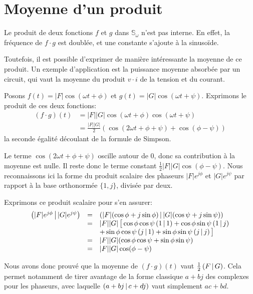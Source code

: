 \section{Moyenne d'un produit}

Le produit de deux fonctions $f$ et $g$ dans $\mathbb{S}_\omega$
n'est pas interne.
En effet, la fréquence de $f \cdot g$ est doublée,
et une constante s'ajoute à la sinusoïde.

Toutefois, il est possible d'exprimer de manière intéressante
la moyenne de ce produit.
Un exemple d'application est la puissance moyenne absorbée par un circuit,
qui vaut la moyenne du produit $v\cdot i$ de la tension et du courant.

Posons $f(t) = |F|\cos(\omega t + \phi)$ et $g(t) = |G|\cos(\omega t + \psi)$.
Exprimons le produit de ces deux fonctions:
\begin{equation}
    \begin{split}
        (f\cdot g)(t) &= |F||G|\cos(\omega t + \phi)\cos(\omega t + \psi) \\
        &= \frac{|F||G|}{2}(\cos(2\omega t + \phi + \psi) + \cos(\phi - \psi))
    \end{split}
\end{equation}
la seconde égalité découlant de la formule de Simpson.

Le terme $\cos(2\omega t + \phi + \psi)$ oscille autour de 0,
donc sa contribution à la moyenne est nulle.
Il reste donc le terme constant $\frac{1}{2}|F||G|\cos(\phi - \psi)$.
Nous reconnaissons ici la forme du produit scalaire des phaseurs
$|F|e^{j\phi}$ et $|G|e^{j\psi}$ par rapport à la base orthonormée $\{1,j\}$,
divisée par deux.

Exprimons ce produit scalaire pour s'en assurer:
\begin{equation}
    \begin{array}{rcl}
        \left(|F|e^{j\phi}\,\middle|\,|G|e^{j\psi}\right)
        &=& \left(|F|(\cos\phi+j\sin\phi)\,\middle|\,|G|(\cos\psi+j\sin\psi)\right) \\
        &=& |F||G|\,\big[\cos\phi\cos\psi \left(1\,\middle|\,1\right)
        + \cos\phi\sin\psi \left(1\,\middle|\,j\right) \\
        && + \sin\phi\cos\psi \left(j\,\middle|\,1\right)
        + \sin\phi\sin\psi \left(j\,\middle|\,j\right)\big] \\
        &=& |F||G|(\cos\phi\cos\psi + \sin\phi\sin\psi) \\
        &=& |F||G|\cos(\phi-\psi)
    \end{array}
\end{equation}

Nous avons donc prouvé que la moyenne de $(f\cdot g)(t)$
vaut $\frac{1}{2}\left(F\,\middle|\,G\right)$.
Cela permet notamment de tirer avantage de la forme classique $a+bj$
des complexes pour les phaseurs,
avec laquelle $\left(a+bj\,\middle|\,c+dj\right)$ vaut simplement $ac + bd$.
